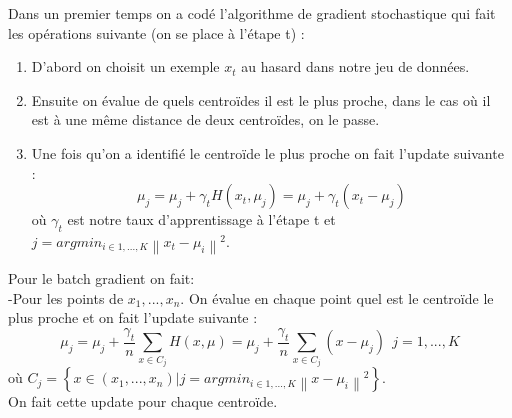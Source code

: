 \documentclass{article}
\begin{document}
Dans un premier temps on a codé l'algorithme de gradient stochastique qui fait les opérations suivante (on se place à l'étape t) :
\begin{enumerate}
    \item D'abord on choisit un exemple $x_t$ au hasard dans notre jeu de données.
    \item Ensuite on évalue de quels centroïdes il est le plus proche, dans le cas où il est à une même distance de deux centroïdes, on le passe.
    \item Une fois qu'on a identifié le centroïde le plus proche on fait l'update suivante :
\begin{equation*}
\mu_j=\mu_j+\gamma_tH(x_t,\mu_j)=\mu_j+\gamma_t(x_t-\mu_j)
\end{equation*}
où $\gamma_t$ est notre taux d'apprentissage à l'étape t et $j=\displaystyle argmin_{i\in{1,...,K}}\left\|x_t-\mu_i\right\|^2$.
\end{enumerate}
\bigskip

Pour le batch gradient on fait:\\
-Pour les points de $x_1,...,x_n$. On évalue en chaque point quel est le centroïde le plus proche et on fait l'update suivante : 
\begin{equation*}
    \mu_j=\mu_j+\frac{\gamma_t}{n}\displaystyle\sum_{x\in C_j}H(x,\mu)=\mu_j+\frac{\gamma_t}{n}\displaystyle\sum_{x\in C_j} (x-\mu_j)~~j=1,...,K
\end{equation*}
où $C_j=\left\{x\in (x_1,...,x_n)| j= \displaystyle argmin_{i\in{1,...,K}}\left\|x-\mu_i\right\|^2\right\}$.\\
On fait cette update pour chaque centroïde.
\bigskip
\end{document}
